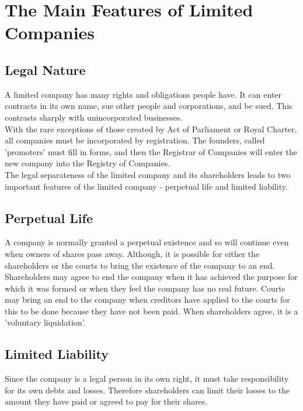 \documentclass{report}
\begin{document}
\section{The Main Features of Limited Companies}

\subsection{Legal Nature}
A limited company has many rights and obligations people have. It can enter contracts in its own name, sue other people and corporations, and be sued. This contrasts sharply with unincorporated businesses.\\

With the rare exceptions of those created by Act of Parliament or Royal Charter, all companies must be incorporated by registration. The founders, called 'promoters' must fill in forms, and then the Registrar of Companies will enter the new company into the Registry of Companies.\\

The legal separateness of the limited company and its shareholders leads to two important features of the limited company - perpetual life and limited liability.

\subsection{Perpetual Life}
A company is normally granted a perpetual existence and so will continue even when owners of shares pass away. Although, it is possible for either the shareholders or the courts to bring the existence of the company to an end. Shareholders may agree to end the company when it has achieved the purpose for which it was formed or when they feel the company has no real future. Courts may bring an end to the company when creditors have applied to the courts for this to be done because they have not been paid. When shareholders agree, it is a 'voluntary liquidation'.

\subsection{Limited Liability}
Since the company is a legal person in its own right, it must take responsibility for its own debts and losses. Therefore shareholders can limit their losses to the amount they have paid or agreed to pay for their shares.
\end{document}
